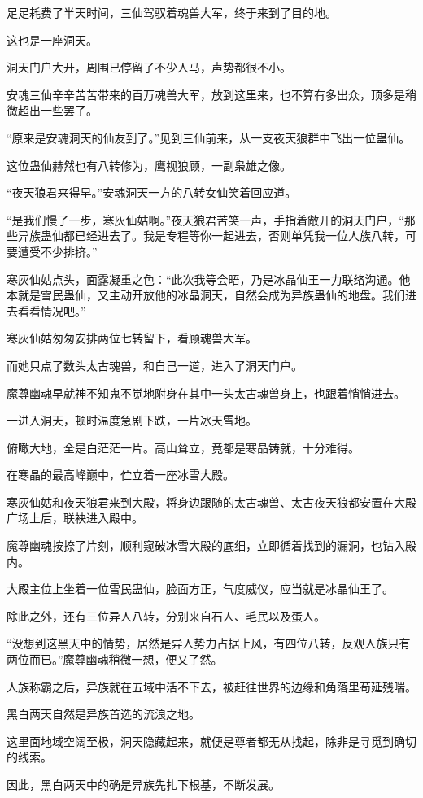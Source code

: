 \begin{this_body}
足足耗费了半天时间，三仙驾驭着魂兽大军，终于来到了目的地。

这也是一座洞天。

洞天门户大开，周围已停留了不少人马，声势都很不小。

安魂三仙辛辛苦苦带来的百万魂兽大军，放到这里来，也不算有多出众，顶多是稍微超出一些罢了。

“原来是安魂洞天的仙友到了。”见到三仙前来，从一支夜天狼群中飞出一位蛊仙。

这位蛊仙赫然也有八转修为，鹰视狼顾，一副枭雄之像。

“夜天狼君来得早。”安魂洞天一方的八转女仙笑着回应道。

“是我们慢了一步，寒灰仙姑啊。”夜天狼君苦笑一声，手指着敞开的洞天门户，“那些异族蛊仙都已经进去了。我是专程等你一起进去，否则单凭我一位人族八转，可要遭受不少排挤。”

寒灰仙姑点头，面露凝重之色：“此次我等会晤，乃是冰晶仙王一力联络沟通。他本就是雪民蛊仙，又主动开放他的冰晶洞天，自然会成为异族蛊仙的地盘。我们进去看看情况吧。”

寒灰仙姑匆匆安排两位七转留下，看顾魂兽大军。

而她只点了数头太古魂兽，和自己一道，进入了洞天门户。

魔尊幽魂早就神不知鬼不觉地附身在其中一头太古魂兽身上，也跟着悄悄进去。

一进入洞天，顿时温度急剧下跌，一片冰天雪地。

俯瞰大地，全是白茫茫一片。高山耸立，竟都是寒晶铸就，十分难得。

在寒晶的最高峰巅中，伫立着一座冰雪大殿。

寒灰仙姑和夜天狼君来到大殿，将身边跟随的太古魂兽、太古夜天狼都安置在大殿广场上后，联袂进入殿中。

魔尊幽魂按捺了片刻，顺利窥破冰雪大殿的底细，立即循着找到的漏洞，也钻入殿内。

大殿主位上坐着一位雪民蛊仙，脸面方正，气度威仪，应当就是冰晶仙王了。

除此之外，还有三位异人八转，分别来自石人、毛民以及蛋人。

“没想到这黑天中的情势，居然是异人势力占据上风，有四位八转，反观人族只有两位而已。”魔尊幽魂稍微一想，便又了然。

人族称霸之后，异族就在五域中活不下去，被赶往世界的边缘和角落里苟延残喘。

黑白两天自然是异族首选的流浪之地。

这里面地域空阔至极，洞天隐藏起来，就便是尊者都无从找起，除非是寻觅到确切的线索。

因此，黑白两天中的确是异族先扎下根基，不断发展。


\end{this_body}
